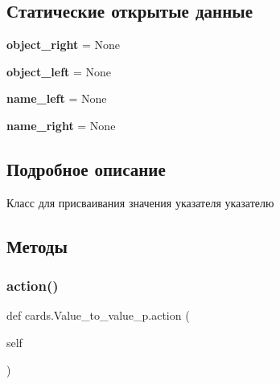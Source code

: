 \subsection*{Статические открытые данные}
\begin{DoxyCompactItemize}
\item 
\mbox{\label{classcards_1_1_value__to__value__p_a8dfe9ce18597aad452a85229f33c147e}} 
{\bfseries object\+\_\+right} = None
\item 
\mbox{\label{classcards_1_1_value__to__value__p_a724a0f6cd7071f3eef46fb3ff82419e9}} 
{\bfseries object\+\_\+left} = None
\item 
\mbox{\label{classcards_1_1_value__to__value__p_a8a50f5922d3b441ee312c369ff6a58b8}} 
{\bfseries name\+\_\+left} = None
\item 
\mbox{\label{classcards_1_1_value__to__value__p_ab9b4765db353d34c56cd9b85ab13441d}} 
{\bfseries name\+\_\+right} = None
\end{DoxyCompactItemize}


\subsection{Подробное описание}
Класс для присваивания значения указателя указателю 



\subsection{Методы}
\mbox{\label{classcards_1_1_value__to__value__p_a0f506f22814df6d698d53826c1c674d3}} 
\subsubsection{\texorpdfstring{action()}{action()}}
{\footnotesize\ttfamily def cards.\+Value\+\_\+to\+\_\+value\+\_\+p.\+action (\begin{DoxyParamCaption}\item[{}]{self }\end{DoxyParamCaption})}



